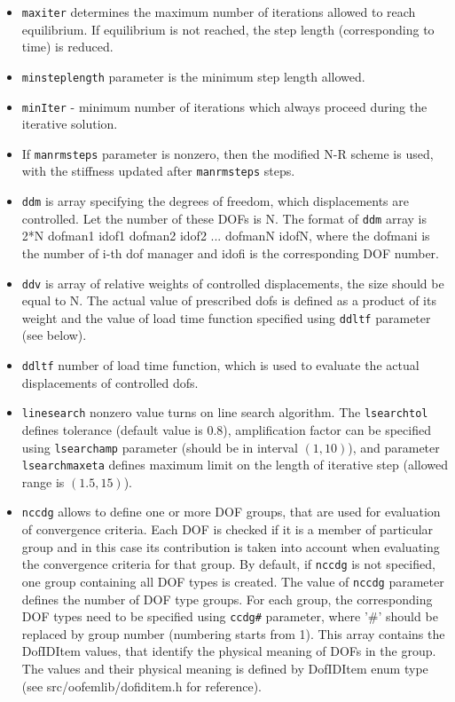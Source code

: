 \documentclass[a4paper]{article}
\newcommand{\param}[1]{\texttt{#1}} %
\begin{document}
\begin{itemize}
\item \param{maxiter} determines the maximum
number of iterations allowed to reach equilibrium. If equilibrium is
not reached, the step length (corresponding to time) is reduced.
\item \param{minsteplength} parameter is the minimum step length
allowed.
\item \param{minIter} - minimum number of iterations which always proceed during the iterative solution.
\item If \param{manrmsteps} parameter is nonzero, then the modified
N-R scheme is used, with the stiffness updated after
\param{manrmsteps} steps.
\item \param{ddm} is array specifying the degrees of freedom,
which displacements are controlled.
Let the number of these DOFs is N.
The format of \param{ddm} array is 2*N dofman1 idof1
dofman2 idof2 ... dofmanN idofN, where the dofmani is the number of i-th dof manager  and idofi is the
corresponding DOF number.
\item \param{ddv} is array of relative weights of controlled
displacements, the size should be equal to N. The actual value of
prescribed dofs is defined as a product of its weight and the value of
load time function specified using \param{ddltf} parameter (see
below).
\item \param{ddltf} number of load time function, which is used to
evaluate the actual displacements of controlled dofs.
\item \param {linesearch} nonzero value turns on line search
  algorithm. The \param{lsearchtol} defines tolerance (default value
  is 0.8), amplification
  factor can be specified using \param{lsearchamp} parameter (should
  be in interval $(1,10)$), and parameter \param{lsearchmaxeta}
  defines maximum limit on the length of iterative step (allowed range
  is $(1.5,15)$).
\item \param{nccdg} allows to define one or more DOF groups, that are used for evaluation of convergence criteria. Each DOF is checked if it is a member of particular group and in this case its contribution is taken into account when evaluating the convergence criteria for that group. By default, if \param{nccdg} is not specified, one group containing all DOF types is created. The value of \param{nccdg} parameter defines the number of DOF type groups. For each group, the corresponding DOF types need to be specified using \param{ccdg\#} parameter, where '\#' should be replaced by group number (numbering starts from 1). This array contains the DofIDItem values, that identify the physical meaning of DOFs in the group. The values and their physical meaning is defined by DofIDItem enum type (see src/oofemlib/dofiditem.h for reference).

\end{itemize}
\end{document}
